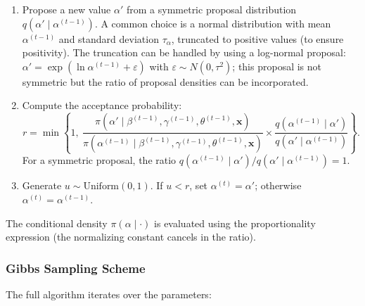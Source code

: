 \documentclass[12pt]{article}
\begin{document}
\begin{enumerate}
    \item Propose a new value \(\alpha'\) from a symmetric proposal distribution
    \(q(\alpha'\mid\alpha^{(t-1)})\). A common choice is a normal distribution
    with mean \(\alpha^{(t-1)}\) and standard deviation \(\tau_{\alpha}\), truncated
    to positive values (to ensure positivity). The truncation can be handled by
    using a log-normal proposal: \(\alpha' = \exp(\ln\alpha^{(t-1)} + \varepsilon)\)
    with \(\varepsilon\sim N(0,\tau^2)\); this proposal is not symmetric but the
    ratio of proposal densities can be incorporated.
    \item Compute the acceptance probability:
    \[
    r = \min\left\{1,\
        \frac{\pi(\alpha'\mid\beta^{(t-1)},\gamma^{(t-1)},\theta^{(t-1)},\mathbf{x})}
             {\pi(\alpha^{(t-1)}\mid\beta^{(t-1)},\gamma^{(t-1)},\theta^{(t-1)},\mathbf{x})}
        \times \frac{q(\alpha^{(t-1)}\mid\alpha')}{q(\alpha'\mid\alpha^{(t-1)})}
        \right\}.
    \]
    For a symmetric proposal, the ratio \(q(\alpha^{(t-1)}\mid\alpha')/q(\alpha'\mid\alpha^{(t-1)})=1\).
    \item Generate \(u\sim\text{Uniform}(0,1)\). If \(u < r\), set \(\alpha^{(t)} = \alpha'\);
    otherwise \(\alpha^{(t)} = \alpha^{(t-1)}\).
\end{enumerate}



The conditional density \(\pi(\alpha\mid\cdot)\) is evaluated using the proportionality
expression (the normalizing constant cancels in the ratio).



\subsubsection{Gibbs Sampling Scheme}



The full algorithm iterates over the parameters:
\end{document}
